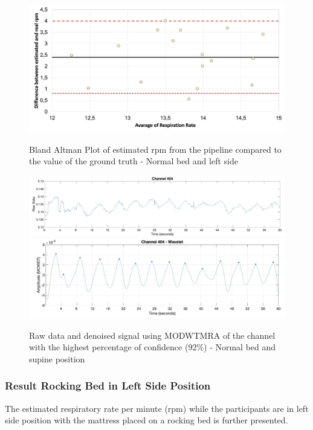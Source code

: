 \begin{figure}[p]
  \centering
  \includegraphics[width=\textwidth]{img/balnd4.png}

  \caption{Bland Altman Plot of estimated rpm from the pipeline compared to the value of the ground truth - Normal bed and left side}
  \label{fig:baln4}
  \vspace{1.5cm}
  \includegraphics[width=\textwidth]{img/404.jpg}
  \includegraphics[width=\textwidth]{img/404_wave.jpg}
\caption{Raw data and denoised signal using MODWTMRA of the channel with the highest percentage of confidence (92\%) - Normal bed and supine position}
  \label{fig:rec4}
\end{figure}





\clearpage
\subsubsection{Result Rocking Bed in Left Side Position}  %

The estimated respiratory rate per minute (rpm) while the participants are in left side position with the mattress placed on a rocking bed is further presented. 

